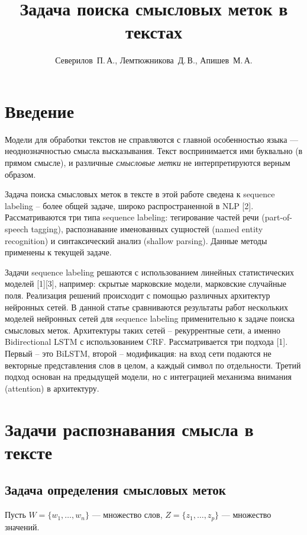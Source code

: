 \documentclass[12pt,twoside]{article}
\title
    [Задача поиска смысловых меток в текстах] %
    {Задача поиска смысловых меток в текстах}
\author
    [Северилов~П.\,А.] %
    {Северилов~П.\,А., Лемтюжникова~Д.\,В., Апишев~М.\,А.} %
    [Северилов~П.\,А.$^1$, Лемтюжникова~Д.\,В.$^1$, Апишев~М.\,А.$^2$] %
\begin{document}
\maketitle

\section{Введение}
 Модели для обработки текстов не справляются с главной особенностью языка — неоднозначностью смысла высказывания. Текст воспринимается ими буквально (в прямом смысле), и различные \emph{смысловые метки} не интерпретируются верным образом. 

Задача поиска смысловых меток в тексте  в этой работе сведена к sequence labeling -- более общей задаче, широко распространенной в NLP [2]. Рассматриваются три типа sequence labeling: тегирование частей речи (part-of-speech tagging), распознавание именованных сущностей (named entity recognition) и синтаксический анализ (shallow parsing). Данные методы применены к текущей задаче.

 Задачи sequence labeling решаются с использованием линейных статистических моделей [1][3], например: скрытые марковские модели, марковские случайные поля. Реализация решений происходит с помощью различных архитектур нейронных сетей. В данной статье сравниваются результаты работ нескольких моделей нейронных сетей для sequence labeling применительно к задаче поиска смысловых меток. Архитектуры таких сетей -- рекуррентные сети, а именно Bidirectional LSTM с использованием CRF. Рассматривается три подхода [1]. Первый -- это BiLSTM, второй -- модификация: на вход сети подаются не векторные представления слов в целом, а каждый символ по отдельности. Третий подход основан на предыдущей модели, но с интеграцией механизма внимания (attention) в архитектуру. %
\section{Задачи распознавания смысла в тексте}
\subsection{Задача определения смысловых меток}
Пусть $W=\{w_1,\ldots,w_n\}$ --- множество слов, $Z=\{z_1,\ldots,z_p\}$ --- множество значений.
\end{document}
